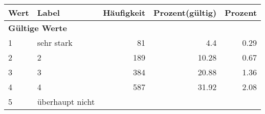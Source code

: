      \begin{longtable}{lXrrr}
     \toprule
     \textbf{Wert} & \textbf{Label} & \textbf{Häufigkeit} & \textbf{Prozent(gültig)} & \textbf{Prozent} \\
     \endhead
     \midrule
     \multicolumn{5}{l}{\textbf{Gültige Werte}}\\

     1 &
     \multicolumn{1}{X}{ sehr stark   } &


       \num{81} &
       \num[round-mode=places,round-precision=2]{4.4} &
         \num[round-mode=places,round-precision=2]{0.29} \\

     2 &
     \multicolumn{1}{X}{ 2   } &


       \num{189} &
       \num[round-mode=places,round-precision=2]{10.28} &
         \num[round-mode=places,round-precision=2]{0.67} \\

     3 &
     \multicolumn{1}{X}{ 3   } &


       \num{384} &
       \num[round-mode=places,round-precision=2]{20.88} &
         \num[round-mode=places,round-precision=2]{1.36} \\

     4 &
     \multicolumn{1}{X}{ 4   } &


       \num{587} &
       \num[round-mode=places,round-precision=2]{31.92} &
         \num[round-mode=places,round-precision=2]{2.08} \\

     5 &
     \multicolumn{1}{X}{ überhaupt nicht   } &



\end{longtable}
